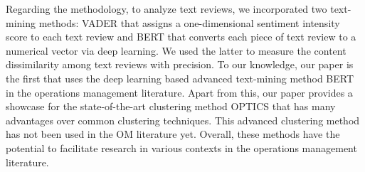 \documentclass[msom,blindrev]{informs3}
\begin{document}
Regarding the methodology, to analyze text reviews, we incorporated two text-mining methods: VADER that assigns a one-dimensional sentiment intensity score to each text review  and BERT that converts each piece of text review to a numerical vector via deep learning. We used the latter to measure the content dissimilarity among text reviews with precision. To our knowledge, our paper is the first that uses the deep learning based advanced text-mining method BERT in the operations management literature.  Apart from this, our paper provides a showcase for the state-of-the-art clustering method OPTICS that has many advantages over common clustering techniques. This advanced clustering method has not been used in the OM literature yet. Overall, these methods have the potential to facilitate research in various contexts in the operations management literature.
	
	
	
	\newpage

\ECSwitch


\vspace{-10pt}
%
\end{document}
